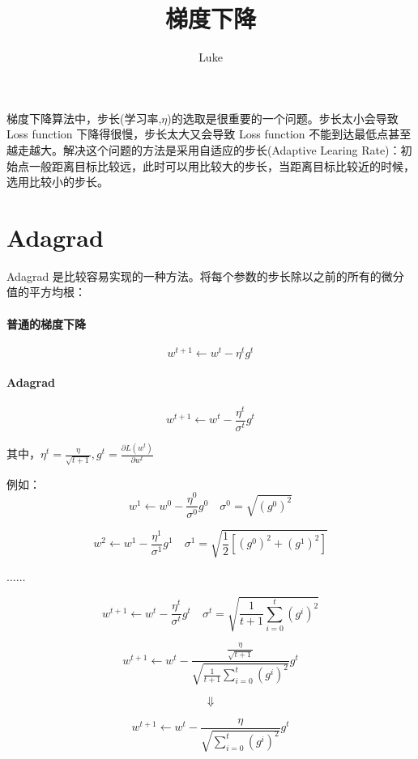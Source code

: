 \documentclass[UTF8,a4paper]{ctexart}
\title{梯度下降}
\author{Luke}
\begin{document}
\maketitle

梯度下降算法中，步长(学习率,$\eta$)的选取是很重要的一个问题。步长太小会导致 Loss function 下降得很慢，步长太大又会导致 Loss function 不能到达最低点甚至越走越大。解决这个问题的方法是采用自适应的步长(Adaptive Learing Rate)：初始点一般距离目标比较远，此时可以用比较大的步长，当距离目标比较近的时候，选用比较小的步长。

\section{Adagrad}

Adagrad 是比较容易实现的一种方法。将每个参数的步长除以之前的所有的微分值的平方均根：

\paragraph{普通的梯度下降}
\begin{equation}
w^{t+1}\leftarrow w^{t}-\eta^t g^t
\end{equation}

\paragraph{Adagrad}
\begin{equation}
w^{t+1}\leftarrow w^t- \frac{\eta^t}{\sigma^t}g^t
\end{equation}

其中，$\eta^t=\frac{\eta}{\sqrt{t+1}},g^t=\frac{\partial L(w^t)}{\partial w^t}$

例如：
\[w^1\leftarrow w^0-\frac{\eta^0}{\sigma^0} g^0 \quad \sigma^0=\sqrt{(g^0)^2}\]

\[w^2\leftarrow w^1-\frac{\eta^1}{\sigma^1}g^1 \quad \sigma^1=\sqrt{\frac{1}{2}[(g^0)^2+(g^1)^2]}  \]

\begin{center}
$\dots\dots$
\end{center}

\[w^{t+1}\leftarrow w^t-\frac{\eta^t}{\sigma^t}g^t \quad \sigma^t=\sqrt{\frac{1}{t+1}\sum^t_{i=0}(g^i)^2}\]

\[w^{t+1}\leftarrow w^t-\frac{\frac{\eta}{\sqrt{t+1}}}{\sqrt{\frac{1}{t+1}\sum^t_{i=0}(g^i)^2}}g^t\]


\[\Downarrow\]
 

\begin{equation}
w^{t+1}\leftarrow w^t-\frac{\eta}{\sqrt{\sum^t_{i=0}(g^i)^2}}g^t
\end{equation}
\end{document}
